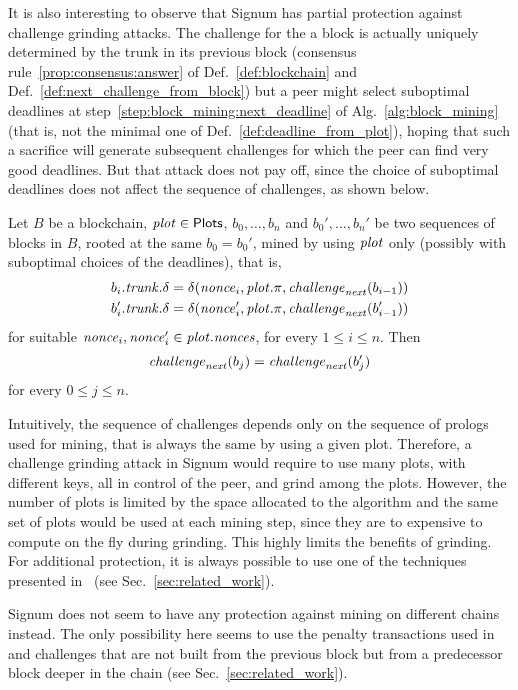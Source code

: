 It is also interesting to observe that Signum has partial protection
against challenge grinding attacks.
The challenge for the a block is actually uniquely determined by the trunk in its
previous block
(consensus rule~\ref{prop:consensus:answer} of Def.~\ref{def:blockchain}
and Def.~\ref{def:next_challenge_from_block}) but a peer
might select suboptimal deadlines at step~\ref{step:block_mining:next_deadline}
of Alg.~\ref{alg:block_mining} (that is, not the minimal one of Def.~\ref{def:deadline_from_plot}),
hoping that such a sacrifice will generate subsequent challenges for which the peer
can find very good deadlines.
But that attack does not pay off, since the choice of suboptimal deadlines does not
affect the sequence of challenges, as shown below.
%
\begin{proposition}\label{prop:no_challenge_grinding}
  Let $B$ be a blockchain, ${\mathit{plot}}\in{\mathsf{Plots}}$, $b_0,\ldots,b_n$ and
  $b_0',\ldots,b_n'$ be two sequences of blocks in $B$, rooted at the same
  $b_0=b_0'$, mined by using ${\mathit{plot}}$ only
  (possibly with suboptimal choices of the deadlines), that is,
  \begin{align*}
    b_i.{\mathit{trunk}}.\delta&=\delta({\mathit{nonce}}_i,{\mathit{plot}}.\pi,{\mathit{challenge}}_{\mathit{next}}(b_{i-1}))\\
    b'_i.{\mathit{trunk}}.\delta&=\delta({\mathit{nonce}}'_i,{\mathit{plot}}.\pi,{\mathit{challenge}}_{\mathit{next}}(b'_{i-1}))
  \end{align*}
  for suitable ${\mathit{nonce}}_i,{\mathit{nonce}}_i'\in{\mathit{plot}}.{\mathit{nonces}}$, for every $1\le i\le n$. Then
  \[
  {\mathit{challenge}}_{\mathit{next}}(b_j)={\mathit{challenge}}_{\mathit{next}}(b'_j)
  \]
  for every $0\le j\le n$.
\end{proposition}
%
Intuitively, the sequence of challenges depends only on
the sequence of prologs used for mining, that is always the same by using a given plot.
Therefore, a challenge grinding attack in Signum
would require to use many plots, with different keys, all in control of the peer,
and grind among the plots. However, the number of plots is limited by the space
allocated to the algorithm and the same set of plots
would be used at each mining step, since they are to expensive to compute
on the fly during grinding. This highly
limits the benefits of grinding. For additional protection, it is always possible to use
one of the techniques presented in~\cite{ParkKFGAP18} (see Sec.~\ref{sec:related_work}).

Signum does not seem to have any protection against mining on different chains instead.
The only possibility here seems to use the penalty transactions used in~\cite{ParkKFGAP18}
and challenges that
are not built from the previous block but from a predecessor block deeper in the chain
(see Sec.~\ref{sec:related_work}).

